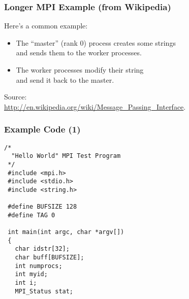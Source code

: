\documentclass[aspectratio=43]{beamer}
\newenvironment{changemargin}[1]{%
  \begin{list}{}{%
    \setlength{\topsep}{0pt}%
    \setlength{\leftmargin}{#1}%
    \setlength{\rightmargin}{1em}
    \setlength{\listparindent}{\parindent}%
    \setlength{\itemindent}{\parindent}%
    \setlength{\parsep}{\parskip}%
  }%
  \item[]}{\end{list}}
\begin{document}
\begin{frame}
  \frametitle{Longer MPI Example (from Wikipedia)}
  \begin{changemargin}{1cm}

  Here's a common example:

  \begin{itemize}
    \item The ``master'' (rank 0) process creates some strings \\ \qquad and sends them
      to the worker processes.
    \item The worker processes modify their string \\ \qquad and send it back to the master.
  \end{itemize}

  Source:\\
  {\small \url{http://en.wikipedia.org/wiki/Message_Passing_Interface}}.

  \end{changemargin}
\end{frame}

\begin{frame}[fragile]
  \frametitle{Example Code (1)}
  \begin{changemargin}{1cm}

  \begin{lstlisting}
/*
  "Hello World" MPI Test Program
 */
 #include <mpi.h>
 #include <stdio.h>
 #include <string.h>
 
 #define BUFSIZE 128
 #define TAG 0
 
 int main(int argc, char *argv[])
 {
   char idstr[32];
   char buff[BUFSIZE];
   int numprocs;
   int myid;
   int i;
   MPI_Status stat;
  \end{lstlisting}
  \end{changemargin}
\end{frame}
\end{document}

